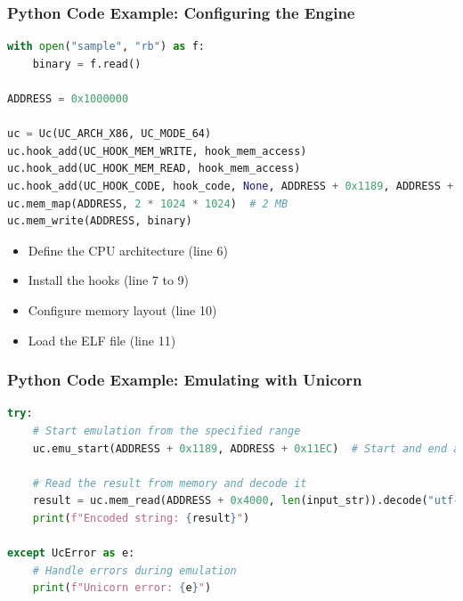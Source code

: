 \begin{frame}[fragile]
\frametitle{Python Code Example: Configuring the Engine}
\begin{lstlisting}[language=Python, caption={Unicorn Engine Example with Hooks}]
with open("sample", "rb") as f:
    binary = f.read()

ADDRESS = 0x1000000

uc = Uc(UC_ARCH_X86, UC_MODE_64)
uc.hook_add(UC_HOOK_MEM_WRITE, hook_mem_access)
uc.hook_add(UC_HOOK_MEM_READ, hook_mem_access)
uc.hook_add(UC_HOOK_CODE, hook_code, None, ADDRESS + 0x1189, ADDRESS + 0x12AC)
uc.mem_map(ADDRESS, 2 * 1024 * 1024)  # 2 MB
uc.mem_write(ADDRESS, binary)
\end{lstlisting}

\begin{itemize}
	\item Define the CPU architecture (line 6)
	\item Install the hooks (line 7 to 9)
	\item Configure memory layout (line 10)
	\item Load the ELF file (line 11)
\end{itemize}
\end{frame}

\begin{frame}[fragile]
\frametitle{Python Code Example: Emulating with Unicorn}
\begin{lstlisting}[language=Python, caption={Unicorn Engine Emulation Example}]
try:
    # Start emulation from the specified range
    uc.emu_start(ADDRESS + 0x1189, ADDRESS + 0x11EC)  # Start and end addresses recovered from Ghidra

    # Read the result from memory and decode it
    result = uc.mem_read(ADDRESS + 0x4000, len(input_str)).decode("utf-8")
    print(f"Encoded string: {result}")

except UcError as e:
    # Handle errors during emulation
    print(f"Unicorn error: {e}")
\end{lstlisting}

\end{frame}

